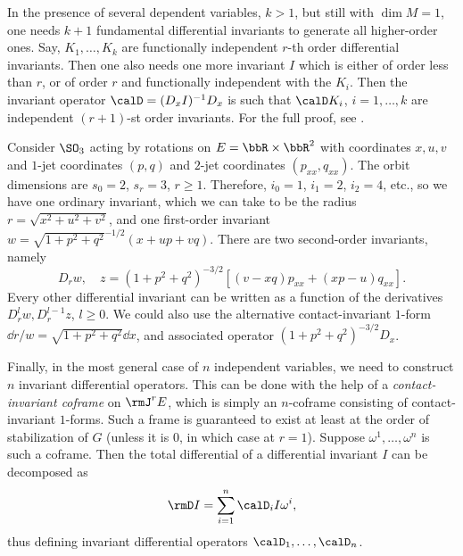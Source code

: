 In the presence of several dependent variables, $k>1$, but still with $\dim M=1$, one needs $k+1$ fundamental differential invariants to generate all higher-order ones. Say, $K_1,\ldots,K_k$ are functionally independent $r$-th order differential invariants. Then one also needs one more invariant $I$ which is either of order less than $r$, or of order $r$ and functionally independent with the $K_i$. Then the invariant operator $\calD=(D_x I)^{-1}D_x$ is such that $\calD K_i$, $i=1,\ldots,k$ are independent $(r+1)$-st order invariants. For the full proof, see \cite[Lem.~5.34]{Olver93}.

\begin{example}
    Consider $\SO_3$ acting by rotations on  $E=\bbR\times\bbR^2$ with coordinates $x,u,v$ and $1$-jet coordinates $(p,q)$ and $2$-jet coordinates $(p_{xx},q_{xx})$. The orbit dimensions are $s_0=2$, $s_r=3$, $r\geq 1$. Therefore, $i_0=1$, $i_1=2$, $i_2=4$, etc., so we have one ordinary invariant, which we can take to be the radius $r=\sqrt{x^2+u^2+v^2}$, and one first-order invariant $w=\sqrt{1+p^2+q^2}^{-1/2}(x+up+vq)$. There are two second-order invariants, namely 
    \[D_rw,\quad z=(1+p^2+q^2)^{-3/2}\left[(v-xq)p_{xx}+(xp-u)q_{xx}\right].\]
    Every other differential invariant can be written as a function of the derivatives $D_r^l w,D_r^{l-1}z$, $l\geq 0$. We could also use the alternative contact-invariant $1$-form $\dd r/w=\sqrt{1+p^2+q^2}\dd x$, and associated operator $(1+p^2+q^2)^{-3/2}D_x$.
\end{example}


Finally, in the most general case of $n$ independent variables, we need to construct $n$ invariant differential operators. This can be done with the help of a \emph{contact-invariant coframe} on $\rmJ^r E$, which is simply an $n$-coframe consisting of contact-invariant $1$-forms. Such a frame is guaranteed to exist at least at the order of stabilization of $G$ (unless it is $0$, in which case at $r=1$). Suppose $\omega^1,\ldots,\omega^n$ is such a coframe. Then the total differential of a differential invariant $I$ can be decomposed as 
\[\rmD I=\sum_{i=1}^n \calD_i I\omega^i,\]
thus defining invariant differential operators $\calD_1,\ldots,\calD_n$. 

